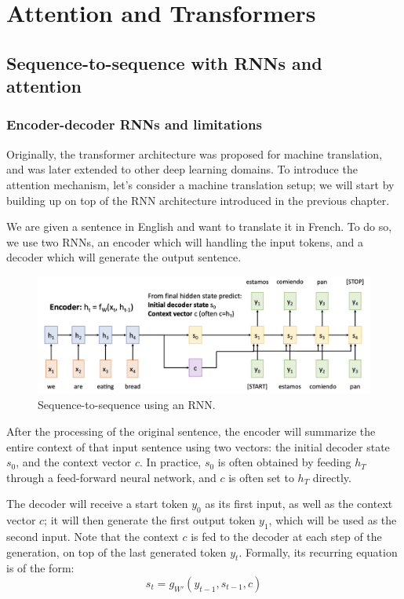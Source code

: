 \section{Attention and Transformers}
\subsection{Sequence-to-sequence with RNNs and attention}
\subsubsection{Encoder-decoder RNNs and limitations}
Originally, the transformer architecture was proposed for machine translation, and was later extended to other deep learning domains. To introduce the attention mechanism, let's consider a machine translation setup; we will start by building up on top of the RNN architecture introduced in the previous chapter.

We are given a sentence in English and want to translate it in French. To do so, we use two RNNs, an encoder which will handling the input tokens, and a decoder which will generate the output sentence.
\begin{figure}[H]
    \centering
    \includegraphics[width=\textwidth]{images/seq-to-seq.png}
    \caption{Sequence-to-sequence using an RNN.}
\end{figure}
After the processing of the original sentence, the encoder will summarize the entire context of that input sentence using two vectors: the initial decoder state $s_0$, and the context vector $c$. In practice, $s_0$ is often obtained by feeding $h_T$ through a feed-forward neural network, and $c$ is often set to $h_T$ directly.

The decoder will receive a start token $y_0$ as its first input, as well as the context vector $c$; it will then generate the first output token $y_1$, which will be used as the second input. Note that the context $c$ is fed to the decoder at each step of the generation, on top of the last generated token $y_t$. Formally, its recurring equation is of the form:
\begin{equation*}
    s_t = g_{W'}(y_{t-1}, s_{t-1}, c)
\end{equation*}

